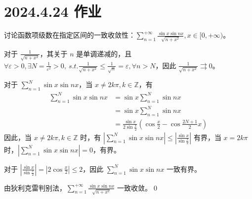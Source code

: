 \ifx\allfiles\undefined

\date{}
\author{尹锦润}

\maketitle
\fi

\section{2024.4.24 作业}

\begin{ques}
	讨论函数项级数在指定区间的一致收敛性：$\displaystyle \sum _{n=1}^{+\infty }\frac{\sin x\sin nx}{\sqrt{n+x^{2}}} ,x\in [ 0,+\infty )$。
\end{ques}



对于 $\displaystyle \frac{1}{\sqrt{n+x^{2}}}$，其关于 $\displaystyle n$ 是单调递减的，且 $\displaystyle \forall \varepsilon  >0,\exists N=\frac{1}{\varepsilon ^{2}}  >0,\ s.t.\frac{1}{\sqrt{n+x^{2}}} \leqslant \frac{1}{\sqrt{n}} =\varepsilon ,\forall n >N$，因此 $\displaystyle \frac{1}{\sqrt{n+x^{2}}} \rightrightarrows 0$。

对于 $\displaystyle \sum _{n=1}^{N}\sin x\sin nx$，当 $\displaystyle x\neq 2k\pi ,k\in \mathbb{Z}$，有
\begin{align*}
	\sum _{n=1}^{N}\sin x\sin nx & =\sin x\sum _{n=1}^{N}\sin nx\\
	& =\sin x\sum _{n=1}^{N}\sin nx\\
	& =\frac{\sin x}{2\sin\frac{x}{2}}\left(\cos\frac{x}{2} -\cos\frac{2N+1}{2} x\right)
\end{align*}
因此，当 $\displaystyle x\neq 2k\pi ,k\in \mathbb{Z}$ 时，有 $\displaystyle \left| \sum _{n=1}^{N}\sin x\sin nx\right| \leqslant \left| \frac{\sin x}{\sin\frac{x}{2}}\right| $ 有界，当 $\displaystyle x=2k\pi $ 时，$\displaystyle \left| \sum _{n=1}^{N}\sin x\sin nx\right| =0$，有界。

对于 $\displaystyle \left| \frac{\sin x}{\sin\frac{x}{2}}\right| =\left| 2\cos\frac{x}{2}\right| \leqslant 2$，因此 $\displaystyle \sum _{n=1}^{N}\sin x\sin nx$ 一致有界。

由狄利克雷判别法，$\displaystyle \sum _{n=1}^{+\infty }\frac{\sin x\sin nx}{\sqrt{n+x^{2}}}$ 一致收敛。\qed 







